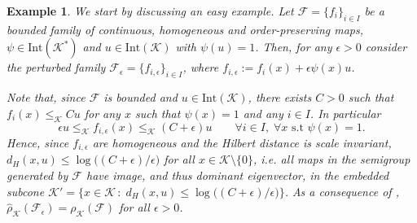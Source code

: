 \documentclass{article}
\newtheorem{example}[theorem]{Example}
\newcommand{\family}{\mathcal{F}}
\newcommand{\cradius}{\rho_{\cone}}
\newcommand{\cgradius}{\widehat{\rho}_{\cone}}
\newcommand{\cone}{\mathcal{K}}
\newcommand{\interior}{\mathrm{Int}}
\newcommand{\dist}{d_H}
\newcommand{\cleq}{\leq_{\cone}}
\begin{document}
\begin{example}\label{ex_perturbed_families_satisfy_JSR=GJSR}
    We start by discussing an easy example. Let $\family=\{f_i\}_{i\in I}$ be a bounded family of continuous, homogeneous and order-preserving maps, $\psi\in \interior(\cone^*)$ and $u\in\interior(\cone)$ with $\psi(u)=1$. Then, for any $\epsilon>0$ consider the perturbed family $\family_\epsilon=\{f_{i,\epsilon}\}_{i\in I}$, where $f_{i,\epsilon}:=f_i(x)+\epsilon\psi(x)u$.

    Note that, since $\family$  is bounded and $u\in \interior(\cone)$, there exists $C>0$ such that $f_i(x)\cleq Cu$
    for any $x$ such that $\psi(x)=1$ and any $i\in I$. In particular
    \begin{equation}
       \epsilon u \cleq f_{i,\epsilon}(x)\cleq (C+\epsilon)u \qquad \forall i\in I,\; \forall x \text{ s.t } \psi(x)=1.
    \end{equation}
    Hence, since $f_{i,\epsilon}$ are homogeneous and the Hilbert distance is scale invariant, $d_H(x,u)\leq \log\big((C+\epsilon)/\epsilon)$ for all $x\in \cone\setminus
    \{0\}$, i.e. all maps in the semigroup generated by $\family$ have image, and thus dominant eigenvector, in the embedded subcone $\cone'=\{x\in \cone\,:\; \dist(x,u)\leq \log\big((C+\epsilon)/\epsilon)\}$. As a consequence of , $\cgradius(\family_{\epsilon})=\cradius(\family)$ for all $\epsilon>0$. 
\end{example}
\end{document}
